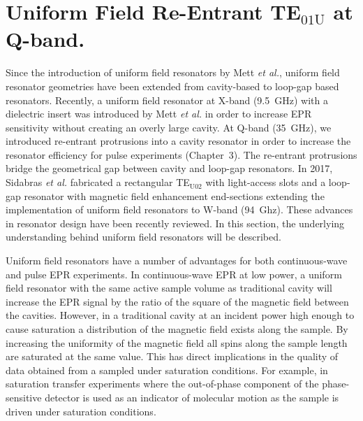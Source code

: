 \chapter[Uniform Field Q-band TE01U]{Uniform Field Re-Entrant TE$_{01\text{U}}$ at Q-band.}

Since the introduction of uniform field resonators by Mett \textit{et al.}, uniform field resonator geometries have been extended from cavity-based \cite{mett2001axially,anderson2002,mett2002recav,hyde2004cavity} to loop-gap based resonators. \cite{UFLGR} Recently, a uniform field resonator at X-band (9.5~GHz) with a dielectric insert was introduced by Mett \textit{et al.} in order to increase EPR sensitivity without creating an overly large cavity. \cite{HydeUFDR2017} At Q-band (35~GHz), we introduced re-entrant protrusions into a cavity resonator in order to increase the resonator efficiency for pulse experiments (Chapter~3). \cite{SidabrasReEnt2017} The re-entrant protrusions bridge the geometrical gap between cavity and loop-gap resonators. In 2017, Sidabras \textit{et al.} fabricated a rectangular TE$_{\text{U}02}$ with light-access slots and a loop-gap resonator with magnetic field enhancement end-sections extending the implementation of uniform field resonators to W-band (94~Ghz). \cite{UFLGR2017} These advances in resonator design have been recently reviewed. \cite{HydeUFRev2019} In this section, the underlying understanding behind uniform field resonators will be described.

Uniform field resonators have a number of advantages for both continuous-wave and pulse EPR experiments. In continuous-wave EPR at low power, a uniform field resonator with the same active sample volume as traditional cavity will increase the EPR signal by the ratio of the square of the magnetic field between the cavities. However, in a traditional cavity at an incident power high enough to cause saturation a distribution of the magnetic field exists along the sample. By increasing the uniformity of the magnetic field all spins along the sample length are saturated at the same value. This has direct implications in the quality of data obtained from a sampled under saturation conditions. For example, in saturation transfer experiments where the out-of-phase component of the phase-sensitive detector is used as an indicator of molecular motion as the sample is driven under saturation conditions. \cite{SaturationTransfer2005} 

